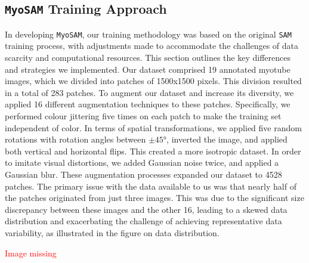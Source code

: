 \subsection{\texttt{MyoSAM} Training Approach}
In developing \texttt{MyoSAM}, our training methodology was based on the original \texttt{SAM} training process, with adjustments made to accommodate the challenges of data scarcity and computational resources. This section outlines the key differences and strategies we implemented.
Our dataset comprised 19 annotated myotube images, which we divided into patches of 1500x1500 pixels. This division resulted in a total of 283 patches. To augment our dataset and increase its diversity, we applied 16 different augmentation techniques to these patches. Specifically, we performed colour jittering five times on each patch to make the training set independent of color. In terms of spatial transformations, we applied five random rotations with rotation angles between $\pm 45°$, inverted the image, and applied both vertical and horizontal flips. This created a more isotropic dataset. In order to imitate visual distortions, we added Gaussian noise twice, and applied a Gaussian blur. These augmentation processes expanded our dataset to 4528 patches. The primary issue with the data available to us was that nearly half of the patches originated from just three images. This was due to the significant size discrepancy between these images and the other 16, leading to a skewed data distribution and exacerbating the challenge of achieving representative data variability, as illustrated in the figure on data distribution.

\textcolor{red}{Image missing}

